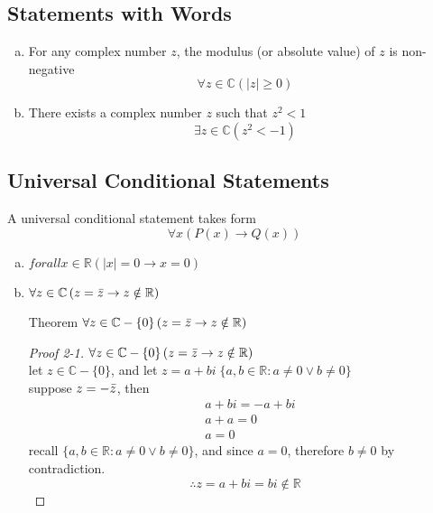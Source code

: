 \documentclass[12pt]{book}
\newcommand{\R}{\mathbb{R}}
\newcommand{\C}{\mathbb{C}}
\newcommand{\paren}[1]{\left( #1 \right)}
\newcommand{\abso}[1]{\left|#1 \right|}
\begin{document}
\subsection{Statements with Words}
\begin{enumerate}[a.]
    \item For any complex number $z$, the modulus (or absolute value) of $z$ is non-negative
    \[
    \forall z \in \C \paren{\abso{z} \geq 0}
    \]

    \item There exists a complex number $z$ such that $z^2 < 1$
    \[
    \exists z \in \C \paren{z^2 <-1}
    \]
\end{enumerate}

\subsection{Universal Conditional Statements}
A universal conditional statement takes form
\[
\forall x \paren{P(x) \rightarrow Q(x)}
\]

\begin{enumerate}[a.]
    \item $forall x \in \R \paren{\abso{x}=0 \rightarrow x=0}$
    
    \item $\forall z \in \C \paren{z = \Bar{z} \rightarrow z \notin \R}$
    
    \item[Theorem] 
    $\forall z \in \C - \{0\}\paren{z = \Bar{z} \rightarrow z \notin \R}$
        \begin{proof}[Proof 2-1]
        $\forall z \in \C - \{0\}\paren{z = \Bar{z} \rightarrow z \notin \R}$\\
            let $z \in \C - \{0 \}$, and let $z = a+bi \; \{ a,b \in \R :a \neq 0 \vee b \neq 0 \}$\\
            suppose $z = - \Bar{z}$, then\\
            \begin{align*}
                &a+bi = -a+bi\\
                &a+a =0\\
                &a = 0
            \end{align*}
            recall \(
            \{ a,b \in \R :a \neq 0 \vee b \neq 0 \}
            \), and since $a=0$, therefore $b\neq 0$ by contradiction.\\
            \[
            \therefore z = a+bi = bi \notin \R
            \]
        \end{proof}
        \newpage
\end{enumerate}
\end{document}
